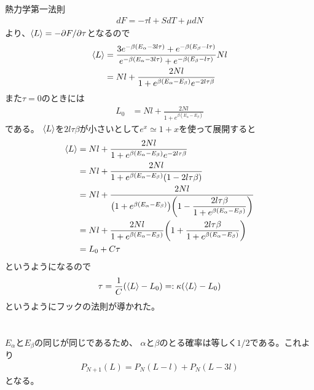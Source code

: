 \documentclass[../../master.tex]{subfiles}
\begin{document}
\section{}
熱力学第一法則
\begin{align}
    dF = -\tau l+SdT+\mu dN
\end{align}
より、\(\ev{L}=-\partial F/\partial \tau\)となるので
\begin{align}
    \ev{L} &= \frac{3e^{-\beta(E_\alpha-3l\tau)}+e^{-\beta(E_\beta-l\tau)}}{e^{-\beta(E_\alpha-3l\tau)}+e^{-\beta(E_\beta-l\tau)}}Nl\\
    &=Nl+\frac{2Nl}{1+e^{\beta(E_\alpha-E_\beta)}e^{-2l\tau\beta}}
\end{align}
また\(\tau=0\)のときには
\begin{align}
    L_0 &=Nl+\frac{2Nl}{1+e^{\beta(E_\alpha-E_\beta)}}
\end{align}
である。
\(\ev{L}\)を\(2l\tau\beta\)が小さいとして\(e^x \simeq 1+x\)を使って展開すると
\begin{align}
    \ev{L} &=Nl+\frac{2Nl}{1+e^{\beta(E_\alpha-E_\beta)}e^{-2l\tau\beta}}\\
    &=Nl+\frac{2Nl}{1+e^{\beta(E_\alpha-E_\beta)}(1-2l\tau\beta)}\\
    &=Nl+\dfrac{2Nl}{\qty(1+e^{\beta(E_\alpha-E_\beta)})\qty(1-\dfrac{2l\tau\beta}{1+e^{\beta(E_\alpha-E_\beta)}})}\\
    &=Nl+\dfrac{2Nl}{1+e^{\beta(E_\alpha-E_\beta)}}\qty(1+\dfrac{2l\tau\beta}{1+e^{\beta(E_\alpha-E_\beta)}})\\
    &= L_0 + C\tau
\end{align}
というようになるので
\begin{align}
    \tau = \frac{1}{C}(\ev{L}-L_0) =: \kappa(\ev{L}-L_0)
\end{align}
というようにフックの法則が導かれた。

\section{}
\subsection{}
\(E_\alpha\)と\(E_\beta\)の同じが同じであるため、
\(\alpha\)と\(\beta\)のとる確率は等しく\(1/2\)である。これより
\begin{align}
P_{N+1}(L) = P_{N}(L-l) + P_{N}(L-3l)
\end{align}
となる。
\end{document}
